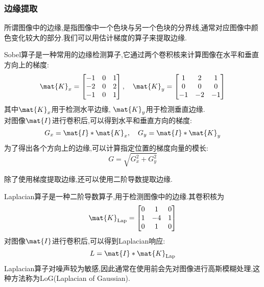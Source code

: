 \documentclass{ctexart}
\begin{document}
\subsubsection{边缘提取}
所谓图像中的边缘,是指图像中一个色块与另一个色块的分界线,通常对应图像中颜色变化较大的部分.我们可以用估计梯度的算子来提取边缘.
\begin{definition}[Sobel算子]
    Sobel算子是一种常用的边缘检测算子,它通过两个卷积核来计算图像在水平和垂直方向上的梯度:
    \[
        \mat{K}_x = \begin{bmatrix}
            -1 & 0 & 1 \\
            -2 & 0 & 2 \\
            -1 & 0 & 1
        \end{bmatrix},\quad
        \mat{K}_y = \begin{bmatrix}
            1 & 2 & 1 \\
            0 & 0 & 0 \\
            -1 & -2 & -1
        \end{bmatrix}
    \]
    其中$\mat{K}_x$用于检测水平边缘, $\mat{K}_y$用于检测垂直边缘.\\
    对图像$\mat{I}$进行卷积后,可以得到水平和垂直方向的梯度:
    \[
        G_x = \mat{I} * \mat{K}_x,\quad G_y = \mat{I} * \mat{K}_y
    \]
    为了得出各个方向上的边缘,可以计算指定位置的梯度向量的模长:
    \[
        G = \sqrt{G_x^2 + G_y^2}
    \]
\end{definition}
除了使用梯度提取边缘,还可以使用二阶导数提取边缘.
\begin{definition}[Laplacian算子]
    Laplacian算子是一种二阶导数算子,用于检测图像中的边缘.其卷积核为
    \[
        \mat{K}_{\text{Lap}} = \begin{bmatrix}
            0 & 1 & 0 \\
            1 & -4 & 1 \\
            0 & 1 & 0
        \end{bmatrix}
    \]
    对图像$\mat{I}$进行卷积后,可以得到Laplacian响应:
    \[L = \mat{I} * \mat{K}_{\text{Lap}}\]
    Laplacian算子对噪声较为敏感,因此通常在使用前会先对图像进行高斯模糊处理,这种方法称为LoG(Laplacian of Gaussian).
\end{definition}
\end{document}
